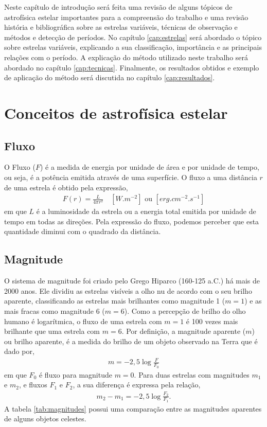 Neste capítulo de introdução será feita uma revisão de alguns tópicos de astrofísica estelar importantes para a compreensão do trabalho e uma revisão história e bibliográfica sobre as estrelas variáveis, técnicas de observação e métodos e detecção de períodos. No capítulo \ref{cap:estrelas} será abordado o tópico sobre estrelas variáveis, explicando a sua classificação, importância e as principais relações com o período. A explicação do método utilizado neste trabalho será abordado no capítulo \ref{cap:tecnicas}. Finalmente, os resultados obtidos e exemplo de aplicação do método será discutida no capítulo \ref{cap:resultados}.



\section{Conceitos de astrofísica estelar}

\nocite{karttunenLivro}

\subsection{Fluxo}

O Fluxo ($F$) é a medida de energia por unidade de área e por unidade de tempo, ou seja, é a potência emitida através de uma superfície. O fluxo a uma distância $r$ de uma estrela é obtido pela expressão,
\begin{align}
F(r) = \frac{L}{4\pi r^2} \quad \left[ \si{W.m^{-2}}\right] \,\, \text{ou} \,\, \left[\si{erg.cm^{-2}.s^{-1}}\right] \label{eq:fluxo}
\end{align}
em que $L$ é a luminosidade da estrela ou a energia total emitida por unidade de tempo em todas as direções. Pela expressão do fluxo, podemos perceber que esta quantidade diminui com o quadrado da distância.

\subsection{Magnitude}

O sistema de magnitude foi criado pelo Grego Hiparco (160-125 a.C.) há mais de 2000 anos. Ele dividiu as estrelas visíveis a olho nu de acordo com o seu brilho aparente, classificando as estrelas mais brilhantes como magnitude 1 ($m=1$) e as mais fracas como magnitude 6 ($m=6$). Como a percepção de brilho do olho humano é logarítmica, o fluxo de uma estrela com 
$m=1$ é 100 vezes mais brilhante que uma estrela com $m=6$. Por definição, a magnitude aparente ($m$) ou brilho aparente, é a medida do brilho de um objeto observado na Terra que é dado por,
\begin{align}
m = - 2,5 \log \frac{F}{F_0}
\end{align}
em que $F_0$ é fluxo para magnitude $m=0$. Para duas estrelas com magnitudes $m_1$ e $m_2$, e fluxos $F_1$ e $F_2$, a sua diferença é expressa pela relação,
\begin{align}
m_2 - m_1 = -2,5 \log \frac{F_2}{F_1}.
\end{align}
A tabela \ref{tab:magnitudes} possui uma comparação entre as magnitudes aparentes de alguns objetos celestes.

